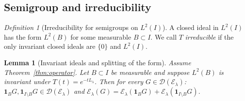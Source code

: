 \documentclass[11pt]{article}
\newtheorem{lemma}[theorem]{Lemma}
\theoremstyle{remark}
\newtheorem{definition}[theorem]{Definition}
\newcommand{\1}{\mathbf 1}
\begin{document}
\subsection{Semigroup and irreducibility}

\begin{definition}[Irreducibility for semigroups on $L^2(I)$]
A closed ideal in $L^2(I)$ has the form $L^2(B)$ for some measurable $B\subset I$.
We call $T$ \emph{irreducible} if the only invariant closed ideals are $\{0\}$ and $L^2(I)$.
\end{definition}

\begin{lemma}[Invariant ideals and splitting of the form]\label{lem:invariance_split}
Assume Theorem~\ref{thm:operator}. Let $B\subset I$ be measurable and suppose
$L^2(B)$ is invariant under $T(t)=e^{-tL_\lambda}$.
Then for every $G\in\mathcal D(\mathcal E_\lambda)$:
$\1_B G,\1_{I\setminus B}G\in\mathcal D(\mathcal E_\lambda)$ and
$\mathcal E_\lambda(G)=\mathcal E_\lambda(\1_B G)+\mathcal E_\lambda(\1_{I\setminus B}G)$.
\end{lemma}
\end{document}
